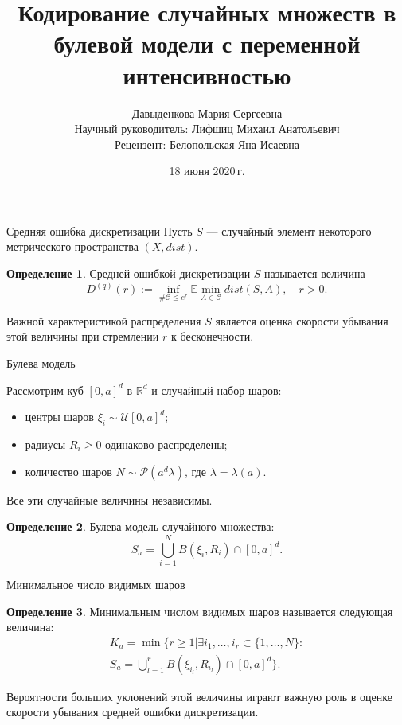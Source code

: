 \documentclass{beamer}
\title[Short title]{Кодирование случайных множеств в булевой модели с переменной интенсивностью} %
\author{Давыденкова Мария Сергеевна\\\medskip
Научный руководитель: Лифшиц Михаил Анатольевич \\
Рецензент: Белопольская Яна Исаевна}
\institute[SPBU] 
{
Санкт-Петербургский государственный университет
\medskip
}
\date{18 июня 2020\,г.} %
\theoremstyle{plain}
\theoremstyle{definition}
\newtheorem*{defn}{Определение}
\theoremstyle{remark}
\def\geq{\geqslant}
\def\leq{\leqslant}
\newcommand{\cuplim}{\bigcup\limits}
\newcommand{\R}{\mathbb{R}}
\newcommand{\E}{\mathbb{E}}
\begin{document}
\begin{frame}
\titlepage %
\end{frame}

\begin{frame}{Средняя ошибка дискретизации}
Пусть $S$  ---  случайный элемент некоторого метрического пространства $(X, dist)$.

\begin{defn}
Средней ошибкой дискретизации $S$ называется величина  $$D^{(q)}(r) := \inf\limits_{\#\mathcal{C}\leq e^r}\E \min\limits_{A\in\mathcal{C}}dist(S, A), \quad r>0.$$
\end{defn}{}

Важной характеристикой распределения $S$ является оценка скорости убывания этой величины при стремлении $r$ к бесконечности.

\end{frame}

\begin{frame}{Булева модель}

Рассмотрим куб $[0,a]^d$ в $\R^d$ и  случайный набор шаров: 
\begin{itemize}
    \item центры шаров $\xi_i \sim \mathcal{U}[0, a]^d$;
    \item радиусы $R_i \geq 0$ одинаково распределены;
    \item  количество шаров $N\sim\mathcal{P}(a^d\lambda)$, где $\lambda = \lambda(a)$.
\end{itemize}   
Все эти случайные величины независимы. 

\begin{defn}
Булева модель случайного множества:
$$S_a = \cuplim_{i=1}^N B(\xi_i, R_i) \cap [0,a]^d.$$
\end{defn}


    
\end{frame}

\begin{frame}{Минимальное число видимых шаров}

\begin{defn}
Минимальным числом видимых шаров называется следующая величина:
\begin{multline*}
    K_a = \min \{r \geq 1 | \exists i_1, \ldots , i_r \subset \{1, \ldots , N\} :\\ S_a = \cuplim_{l=1}^r B(\xi_{i_l}, R_{i_l}) \cap [0,a]^d
    \}.
\end{multline*}
\end{defn}

Вероятности больших уклонений этой величины играют важную роль в оценке скорости убывания средней ошибки дискретизации.

\end{frame}{}
\end{document}
